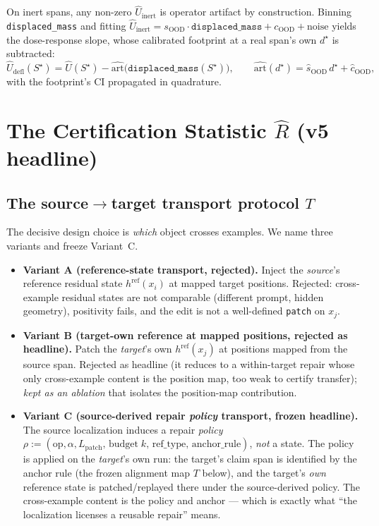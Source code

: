 \documentclass[11pt]{article}
\theoremstyle{plain}
\theoremstyle{definition}
\newcommand{\Uhat}{\widehat{U}}
\newcommand{\Rhat}{\widehat{R}}
\newcommand{\Udefl}{\widehat{U}_{\mathrm{defl}}}
\newcommand{\policy}{\rho}
\newcommand{\Sstar}{S^{\star}}
\begin{document}
On inert spans, any non-zero $\Uhat_{\mathrm{inert}}$ is operator artifact by
construction. Binning \texttt{displaced\_mass} and fitting
$\Uhat_{\mathrm{inert}}=s_{\mathrm{OOD}}\cdot\texttt{displaced\_mass}+c_{\mathrm{OOD}}+\text{noise}$
yields the dose-response slope, whose calibrated footprint at a real span's own
$d^\star$ is subtracted:
\begin{equation}
\Udefl(\Sstar) = \Uhat(\Sstar) - \widehat{\mathrm{art}}\big(\texttt{displaced\_mass}(\Sstar)\big),
\qquad
\widehat{\mathrm{art}}(d^\star)=\hat s_{\mathrm{OOD}}\,d^\star+\hat c_{\mathrm{OOD}},
\label{eq:deflate}
\end{equation}
with the footprint's CI propagated in quadrature.

\section{The Certification Statistic $\Rhat$ (v5 headline)}\label{sec:method}

\subsection{The source$\to$target transport protocol $T$}\label{sec:method:transport}

The decisive design choice is \emph{which} object crosses examples. We name three
variants and freeze Variant~C.
\begin{itemize}[leftmargin=1.4em,itemsep=2pt]
  \item \textbf{Variant A (reference-state transport, rejected).} Inject the
  \emph{source}'s reference residual state $h^{\mathrm{ref}}(x_i)$ at mapped target
  positions. Rejected: cross-example residual states are not comparable (different
  prompt, hidden geometry), positivity fails, and the edit is not a well-defined
  \texttt{patch} on $x_j$.
  \item \textbf{Variant B (target-own reference at mapped positions, rejected as
  headline).} Patch the \emph{target}'s own $h^{\mathrm{ref}}(x_j)$ at positions
  mapped from the source span. Rejected as headline (it reduces to a within-target
  repair whose only cross-example content is the position map, too weak to certify
  transfer); \emph{kept as an ablation} that isolates the position-map contribution.
  \item \textbf{Variant C (source-derived repair \emph{policy} transport, frozen
  headline).} The source localization induces a repair \emph{policy}
  $\policy:=(\mathrm{op},\alpha,L_{\mathrm{patch}},\,\text{budget}\;k,\,\mathrm{ref\_type},\,\text{anchor\_rule})$,
  \emph{not} a state. The policy is applied on the \emph{target}'s own run: the
  target's claim span is identified by the anchor rule (the frozen alignment map
  $T$ below), and the target's \emph{own} reference state is patched/replayed there
  under the source-derived policy. The cross-example content is the policy and
  anchor --- which is exactly what ``the localization licenses a reusable repair''
  means.
\end{itemize}
\end{document}
